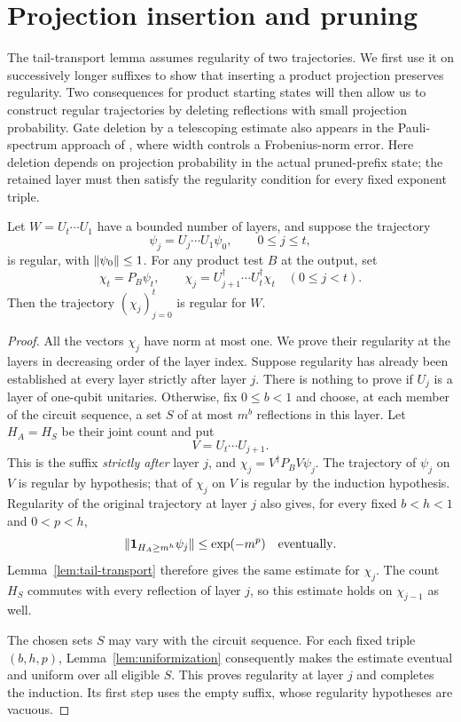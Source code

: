 \section{Projection insertion and pruning}\label{sec:pruning}

The tail-transport lemma assumes regularity of two trajectories.  We first
use it on successively longer suffixes to show that inserting a product
projection preserves regularity.  Two consequences for product starting
states will then allow us to construct regular trajectories by deleting
reflections with small projection probability. Gate deletion by a
telescoping estimate also appears in the Pauli-spectrum approach of
\citet[Lemma~23 and Claim~24]{NadimpalliParhamVasconcelosYuen2024},
where width controls a Frobenius-norm error. Here deletion depends on
projection probability in the actual pruned-prefix state; the retained
layer must then satisfy the regularity condition for every fixed
exponent triple.

\begin{proposition}\label{prop:projection-insertion}
Let $W=U_t\cdots U_1$ have a bounded number of layers, and suppose the
trajectory
\[
 \psi_j=U_j\cdots U_1\psi_0,\qquad 0\le j\le t,
\]
is regular, with $\lVert\psi_0\rVert\le1$.  For any product test $B$ at the
output, set
\[
 \chi_t=P_B\psi_t,\qquad
 \chi_j=U_{j+1}^{\dagger}\cdots U_t^{\dagger}\chi_t
 \quad(0\le j<t).
\]
Then the trajectory $(\chi_j)_{j=0}^t$ is regular for $W$.
\end{proposition}

\begin{proof}
All the vectors $\chi_j$ have norm at most one.  We prove their regularity
at the layers in decreasing order of the layer index.  Suppose regularity
has already been established at every layer strictly after layer $j$.
There is nothing to prove if $U_j$ is a layer of one-qubit unitaries.
Otherwise, fix $0\le b<1$ and choose, at each member of the circuit
sequence, a set $S$ of at most $m^b$ reflections in this layer.  Let
$H_A=H_S$ be their joint count and put
\[
 V=U_t\cdots U_{j+1}.
\]
This is the suffix \emph{strictly after} layer $j$, and
$\chi_j=V^{\dagger}P_BV\psi_j$.  The trajectory of $\psi_j$ on $V$ is
regular by hypothesis; that of $\chi_j$ on $V$ is regular by the
induction hypothesis.  Regularity of the original trajectory at layer
$j$ also gives, for every fixed $b<h<1$ and $0<p<h$,
\[
 \lVert\mathbf 1_{H_A\ge m^h}\psi_j\rVert\le \exp(-m^p)
 \quad\text{eventually}.
\]
Lemma~\ref{lem:tail-transport} therefore gives the same estimate for
$\chi_j$.  The count $H_S$ commutes with every reflection of layer $j$,
so this estimate holds on $\chi_{j-1}$ as well.

The chosen sets $S$ may vary with the circuit sequence.  For each fixed
triple $(b,h,p)$, Lemma~\ref{lem:uniformization} consequently makes the
estimate eventual and uniform over all eligible $S$.  This proves
regularity at layer $j$ and completes the induction.  Its first step
uses the empty suffix, whose regularity hypotheses are vacuous.
\end{proof}

